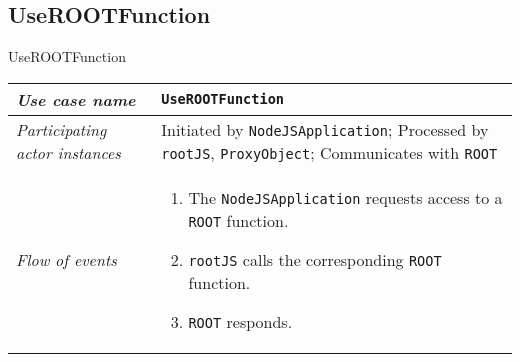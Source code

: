\subsection{UseROOTFunction}
\begin{frame}{UseROOTFunction}
        \begin{longtable}{p{3cm} @{\hskip 1cm} p{7cm}}
                \hline

                \textit{Use case name} & \texttt{UseROOTFunction}\\
                \hline

                \textit{Participating actor instances} & Initiated by \texttt{NodeJSApplication}; Processed by \texttt{rootJS}, \texttt{ProxyObject}; Communicates with \texttt{ROOT}\\
                \hline

                \textit{Flow of events} &
                        \begin{enumerate}
                                \pause

                                \item The \texttt{NodeJSApplication} requests access to a \texttt{ROOT} function.
                                \pause

                                \item \texttt{rootJS} calls the corresponding \texttt{ROOT} function.
                                \pause

                                \item \texttt{ROOT} responds.
                        \end{enumerate}
                        \\
        \end{longtable}
\end{frame}
